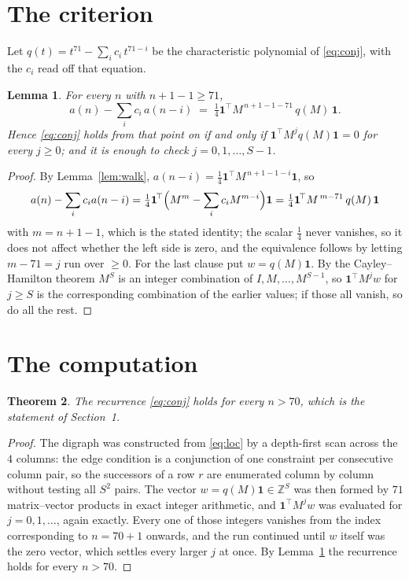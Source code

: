 \documentclass[11pt,a4paper]{article}
\theoremstyle{plain}
\newtheorem{theorem}{Theorem}
\newtheorem{lemma}[theorem]{Lemma}
\theoremstyle{definition}
\begin{document}
\section{The criterion}

Let $q(t)=t^{71}-\sum_i c_i\,t^{71-i}$ be the characteristic polynomial of
\eqref{eq:conj}, with the $c_i$ read off that equation.

\begin{lemma}\label{lem:crit}
For every $n$ with $n+1-1\ge71$,
\[
a(n)-\sum_i c_i\,a(n-i)\;=\;\tfrac1{4}\mathbf{1}^{\!\top}M^{\,n+1-1-71}\,q(M)\,\mathbf{1} .
\]
Hence \eqref{eq:conj} holds from that point on if and only if
$\mathbf{1}^{\!\top}M^{j}q(M)\mathbf{1}=0$ for every $j\ge0$; and it is enough to check
$j=0,1,\dots,S-1$.
\end{lemma}

\begin{proof}
By Lemma~\ref{lem:walk}, $a(n-i)=\tfrac1{4}\mathbf{1}^{\!\top}M^{\,n+1-1-i}\mathbf{1}$, so
\[
a(n)-\sum_i c_i a(n-i)
=\tfrac1{4}\mathbf{1}^{\!\top}\Bigl(M^{m}-\sum_i c_i M^{m-i}\Bigr)\mathbf{1}
=\tfrac1{4}\mathbf{1}^{\!\top}M^{\,m-71}\,q(M)\,\mathbf{1}
\]
with $m=n+1-1$, which is the stated identity; the scalar $\tfrac1{4}$ never vanishes, so it does not affect whether the left side is zero, and the equivalence follows by letting
$m-71=j$ run over $\ge0$. For the last clause put $w=q(M)\mathbf{1}$. By the
Cayley--Hamilton theorem $M^{S}$ is an integer combination of $I,M,\dots,M^{S-1}$, so
$\mathbf{1}^{\!\top}M^{j}w$ for $j\ge S$ is the corresponding combination of the earlier
values; if those all vanish, so do all the rest.
\end{proof}

\section{The computation}

\begin{theorem}
The recurrence \eqref{eq:conj} holds for every $n>70$, which is the statement of
Section~1.
\end{theorem}

\begin{proof}
The digraph was constructed from \eqref{eq:loc} by a depth-first scan across the $4$
columns: the edge condition is a conjunction of one constraint per consecutive column
pair, so the successors of a row $r$ are enumerated column by column without testing all
$S^2$ pairs. The vector $w=q(M)\mathbf{1}\in\mathbb{Z}^{S}$ was then formed by $71$
matrix--vector products in exact integer arithmetic, and $\mathbf{1}^{\!\top}M^{j}w$ was
evaluated for $j=0,1,\dots$, again exactly. Every one of those integers vanishes from the
index corresponding to $n=70+1$ onwards, and the run continued until $w$ itself was the
zero vector, which settles every larger $j$ at once. By Lemma~\ref{lem:crit} the recurrence
holds for every $n>70$.
\end{proof}
\end{document}
